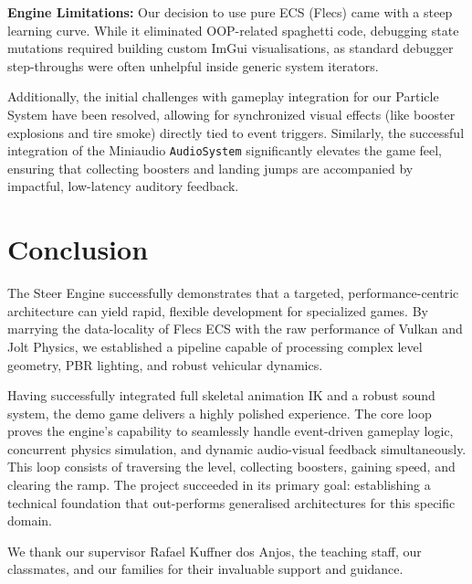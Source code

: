 \documentclass[acmtog, nonacm]{acmart}
\begin{document}
\textbf{Engine Limitations:}
Our decision to use pure ECS (Flecs) came with a steep learning curve. While it eliminated OOP-related spaghetti code, debugging state mutations required building custom ImGui visualisations, as standard debugger step-throughs were often unhelpful inside generic system iterators.

Additionally, the initial challenges with gameplay integration for our Particle System have been resolved, allowing for synchronized visual effects (like booster explosions and tire smoke) directly tied to event triggers. Similarly, the successful integration of the Miniaudio \texttt{AudioSystem} significantly elevates the game feel, ensuring that collecting boosters and landing jumps are accompanied by impactful, low-latency auditory feedback.

\section{Conclusion}

The Steer Engine successfully demonstrates that a targeted, performance-centric architecture can yield rapid, flexible development for specialized games. By marrying the data-locality of Flecs ECS with the raw performance of Vulkan and Jolt Physics, we established a pipeline capable of processing complex level geometry, PBR lighting, and robust vehicular dynamics.

Having successfully integrated full skeletal animation IK and a robust sound system, the demo game delivers a highly polished experience. The core loop proves the engine's capability to seamlessly handle event-driven gameplay logic, concurrent physics simulation, and dynamic audio-visual feedback simultaneously. This loop consists of traversing the level, collecting boosters, gaining speed, and clearing the ramp. The project succeeded in its primary goal: establishing a technical foundation that out-performs generalised architectures for this specific domain.

\begin{acks}
We thank our supervisor Rafael Kuffner dos Anjos, the teaching staff, our classmates, and our families for their invaluable support and guidance.
\end{acks}
\end{document}
